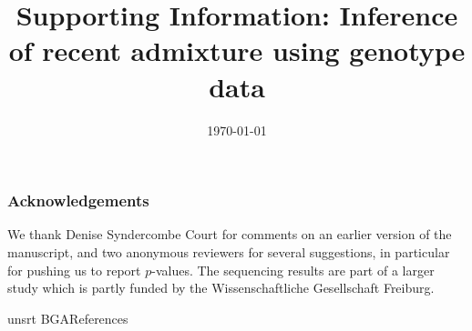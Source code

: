 \documentclass[12pt]{article}
\theoremstyle{definition}
\begin{document}






\subsubsection*{Acknowledgements}
We thank Denise Syndercombe Court for comments on an earlier version of the manuscript, {\color{blue} and two anonymous reviewers for several suggestions, in particular for pushing us to report $p$-values}. The sequencing results are part of a larger study which is partly funded by the Wissenschaftliche Gesellschaft Freiburg. 


{unsrt}
{BGA}{References}
% 

\newpage
\setcounter{page}{1}
\setcounter{section}{0}
\setcounter{figure}{0}
\setcounter{table}{0}
\setcounter{equation}{0}
\thispagestyle{empty}

\begin{center}
 \title{\LARGE Supporting Information: Inference
  of recent admixture using genotype data}

~~


~

\date{\today}

\maketitle
  
\end{center}

\renewcommand{\theequation}{S\arabic{equation}}
\renewcommand{\thefigure}{S\arabic{figure}}
\renewcommand{\thetable}{S\arabic{table}}
\renewcommand{\thesection}{S\arabic{section}}
\end{document}
